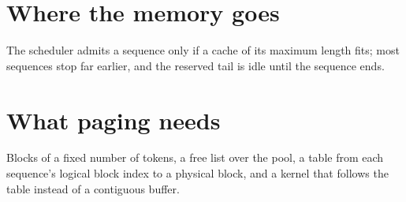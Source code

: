 \section{Where the memory goes}
The scheduler admits a sequence only if a cache of its maximum length fits; most sequences stop far earlier, and the reserved tail is idle until the sequence ends.

\section{What paging needs}
Blocks of a fixed number of tokens, a free list over the pool, a table from each sequence's logical block index to a physical block, and a kernel that follows the table instead of a contiguous buffer.
